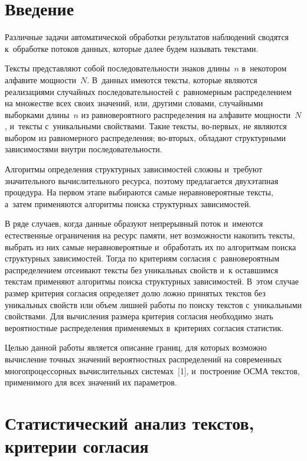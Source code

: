 \begin{multicols}{2}

\label{st\stat}
   
\section{Введение}

    Различные задачи автоматической обработки результатов наблюдений 
сводятся к~обработке потоков данных, которые далее будем называть 
текстами.
    
    Тексты представляют собой последовательности знаков длины~$n$ 
в~некотором алфавите мощности~$N$. В~данных имеются тексты, 
которые являются реализациями случайных последовательностей 
с~равномерным распределением на множестве всех своих значений, или, 
другими словами, случайными выборками длины~$n$ из равновероятного 
распределения на алфавите мощности~$N$, и~тексты с~уникальными 
свойствами. Такие тексты, во-пер\-вых, не являются выбором из 
равномерного распределения; во-вто\-рых, обладают структурными 
зависимостями внутри последовательности.
    
     Алгоритмы определения структурных зависимостей сложны 
и~требуют значительного вычислительного ресурса, поэтому предлагается 
двухэтапная процедура. На первом этапе выбираются самые 
неравновероятные тексты, а~затем применяются алгоритмы поиска 
структурных зависимостей.
    
    В ряде случаев, когда данные образуют непрерывный поток 
и~имеются естественные ограничения на ресурс памяти, нет возможности 
накопить тексты, выбрать из них самые неравновероятные и~обработать их 
по алгоритмам поиска структурных зависимостей. Тогда по критериям 
согласия с~равновероятным распределением отсеивают тексты без 
уникальных свойств и~к оставшимся текстам применяют алгоритмы поиска 
структурных зависимостей. В~этом случае размер критерия согласия 
определяет долю ложно принятых текстов без уникальных свойств или 
объем лишней работы по поиску текстов с~уникальными свойствами. Для 
вычисления размера критерия согласия необходимо знать вероятностные 
распределения при\-ме\-ня\-емых в~критериях согласия статистик. 
    
    Целью данной работы является описание границ, для которых 
возможно вычисление точных значений вероятностных распределений на 
современных многопроцессорных вычислительных сис\-те\-мах~[1], 
и~построение ОСМА текстов, применимого для всех значений их параметров.
    
\section{Статистический анализ текстов, критерии согласия}


\end{multicols}

